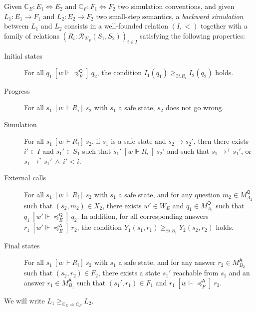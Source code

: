 \documentclass[sigplan,10pt,review,anonymous]{acmart}
\newcommand{\kw}[1]{\ensuremath{ \mathsf{#1} }}
\newcommand{\ifr}[1]{\ [{#1}]\ }
\begin{document}
\begin{definition}
Given
$\mathbb{C}_E : E_1 \Leftrightarrow E_2$ and
$\mathbb{C}_F : F_1 \Leftrightarrow F_2$
two simulation conventions,
and given
$L_1 : E_1 \rightarrow F_1$ and
$L_2 : E_2 \rightarrow F_2$
two small-step semantics,
a \emph{backward simulation} between $L_1$ and $L_2$
consists in a
well-founded relation $(I, <)$
together with a family of relations
$(R_i : \mathcal{R}_{W_F}(S_1, S_2))_{i \in I}$
satisfying the following properties:
\begin{description}
\item[Initial states]
  For all
  $q_1 \ifr{w \Vdash {\preceq}_F^\kw{Q}} q_2$,
  the condition $I_1(q_1) \ge_{\exists i . R_i} I_2(q_2)$ holds.
\item[Progress]
  For all $s_1 \ifr{w \Vdash R_i} s_2$
  with $s_1$ a safe state,
  $s_2$ does not go wrong.
\item[Simulation]
  For all $s_1 \ifr{w \Vdash R_i} s_2$,
  if $s_1$ is a safe state and $s_2 \rightarrow s_2'$,
  then there exists $i' \in I$ and $s_1' \in S_1$
  such that $s_1' \ifr{w \Vdash R_{i'}} s_2'$ and
  such that 
    $s_1 \rightarrow^+ s_1'$, or
    $s_1 \rightarrow^* s_1' \:\wedge\: i' < i$.
\item[External calls]
  For all $s_1 \ifr{w \Vdash R_i} s_2$
  with $s_1$ a safe state, and
  for any question $m_2 \in M_{A_2}^\kw{Q}$
  such that $(s_2, m_2) \in X_2$,
  there exists $w' \in W_E$ and $q_1 \in M_{A_1}^\kw{Q}$
  such that $q_1 \ifr{w' \Vdash {\preceq}_E^\kw{Q}} q_2$.
  In addition, for all corresponding answers
  $r_1 \ifr{w' \Vdash {\preceq}_E^\kw{A}} r_2$,
  the condition $Y_1(s_1, r_1) \ge_{\exists i . R_i} Y_2(s_2, r_2)$ holds.
\item[Final states]
  For all $s_1 \ifr{w \Vdash R_i} s_2$
  with $s_1$ a safe state, and
  for any answer $r_2 \in M_{B_2}^\kw{A}$
  such that $(s_2, r_2) \in F_2$,
  there exists a state $s_1'$ reachable from $s_1$ and
  an answer $r_1 \in M_{B_1}^\kw{A}$ such that
  $(s_1', r_1) \in F_1$ and $r_1 \ifr{w \Vdash {\preceq}_F^\kw{A}} r_2$.
\end{description}
We will write $L_1 \ge_{\mathbb{C}_E \Rightarrow \mathbb{C}_F} L_2$.
\end{definition}
\end{document}
